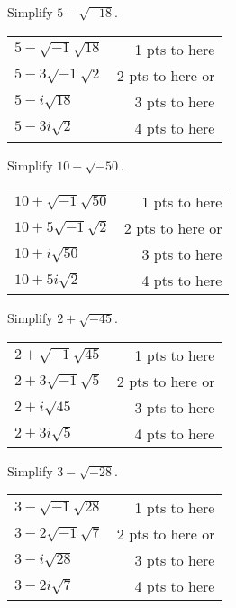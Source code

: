 {
	Simplify $5-\sqrt{-18}$.
}
{
	\begin{tabular}{l r}
	$5-\sqrt{-1}\sqrt{18}$ & 1 pts to here\\
	$5-3\sqrt{-1}\sqrt{2}$ & 2 pts to here or\\
	$5-i\sqrt{18}$ & 3 pts to here\\
	$5-3i\sqrt{2}$ & 4 pts to here
	\end{tabular}
}

{
	Simplify $10+\sqrt{-50}$.
}
{
	\begin{tabular}{l r}
	$10+\sqrt{-1}\sqrt{50}$ & 1 pts to here\\
	$10+5\sqrt{-1}\sqrt{2}$ & 2 pts to here or\\
	$10+i\sqrt{50}$ & 3 pts to here\\
	$10+5i\sqrt{2}$ & 4 pts to here
	\end{tabular}
}

{
	Simplify $2+\sqrt{-45}$.
}
{
	\begin{tabular}{l r}
	$2+\sqrt{-1}\sqrt{45}$ & 1 pts to here\\
	$2+3\sqrt{-1}\sqrt{5}$ & 2 pts to here or\\
	$2+i\sqrt{45}$ & 3 pts to here\\
	$2+3i\sqrt{5}$ & 4 pts to here
	\end{tabular}
}

{
	Simplify $3-\sqrt{-28}$.
}
{
	\begin{tabular}{l r}
	$3-\sqrt{-1}\sqrt{28}$ & 1 pts to here\\
	$3-2\sqrt{-1}\sqrt{7}$ & 2 pts to here or\\
	$3-i\sqrt{28}$ & 3 pts to here\\
	$3-2i\sqrt{7}$ & 4 pts to here
	\end{tabular}
}
